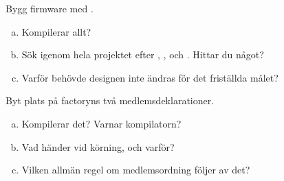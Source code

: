 \label{ex:12:4}
Bygg firmware med .
\begin{enumerate}[a)]
  \item Kompilerar allt?
  \item Sök igenom hela projektet efter , ,  och
    . Hittar du något?
  \item Varför behövde designen inte ändras för det friställda målet?
\end{enumerate}

\label{ex:12:5}
Byt plats på factoryns två medlemsdeklarationer.
\begin{enumerate}[a)]
  \item Kompilerar det? Varnar kompilatorn?
  \item Vad händer vid körning, och varför?
  \item Vilken allmän regel om medlemsordning följer av det?
\end{enumerate}
